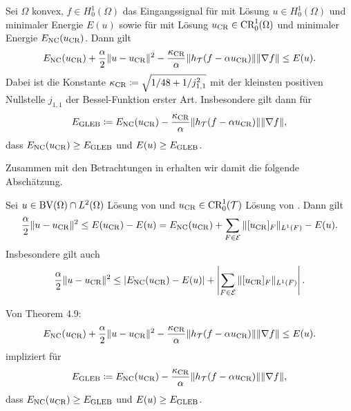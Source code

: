 \begin{theorem}
  \label{thm:gueb}
  Sei $\Omega$ konvex, $f\in H^1_0(\Omega)$ das Eingangssignal für
   mit Lösung $u\in H^1_0(\Omega)$ und minimaler
  Energie $E(u)$ sowie für  mit Lösung $u_\textup{CR}\in
  \textup{CR}^1_0(\Omega)$ und minimaler Energie $E_\textup{NC}(u_\textup{CR})$.
  Dann gilt
  \begin{align*}
    E_\textup{NC}(u_\textup{CR})+\frac{\alpha}{2}\Vert u-u_\textup{CR}\Vert^2
    -\frac{\kappa_{\textup{CR}}}{\alpha}\Vert
    h_{\mathcal{T}}(f-\alpha u_\textup{CR})\Vert \Vert\nabla f\Vert\leq E(u).
  \end{align*}
  Dabei ist die Konstante $\kappa_{\textup{CR}}\coloneqq\sqrt{1/48+1/j_{1,1}^2}$ mit der
  kleinsten positiven Nullstelle $j_{1,1}$ der Bessel-Funktion erster Art.
  Insbesondere gilt dann für 
  \begin{align}
    \label{eq:gleb}
    E_\textup{GLEB} 
    \coloneqq 
    E_\textup{NC}(u_\textup{CR}) - \frac{\kappa_{\textup{CR}}}{\alpha}\Vert h_{\mathcal{T}}(f-\alpha u_\textup{CR})\Vert
    \Vert \nabla f\Vert,
  \end{align}
    dass $E_\textup{NC}(u_\textup{CR})\geq E_\textup{GLEB}$ und $E(u)\geq E_\textup{GLEB}$.

\end{theorem}

Zusammen mit den Betrachtungen in  
erhalten wir damit die folgende Abschätzung.

\begin{corollary}
  Sei $u\in\textup{BV}(\Omega)\cap L^2(\Omega)$ Lösung von
   und $u_\textup{CR}\in\textup{CR}^1_0(\mathcal{T})$ Lösung von
  .
  Dann gilt
  \begin{align*}
    \frac{\alpha}{2}\Vert u-u_\textup{CR}\Vert^2\leq
    E(u_\textup{CR})-E(u)=E_\textup{NC}(u_\textup{CR})+\sum_{F\in\mathcal{E}}\Vert[u_\textup{CR}]_F\Vert_{L^1(F)}-E(u).
  \end{align*}
  Insbesondere gilt auch 
  \begin{align*}
    \frac{\alpha}{2}\Vert u-u_\textup{CR}\Vert^2
    \leq
    \left|E_\textup{NC}(u_\textup{CR})-E(u)\right|+
    \left|\sum_{F\in\mathcal{E}}\Vert[u_\textup{CR}]_F\Vert_{L^1(F)}\right|.
  \end{align*}
\end{corollary}

Von Theorem 4.9:
  \begin{align*}
    E_\textup{NC}(u_\textup{CR})+\frac{\alpha}{2}\Vert u-u_\textup{CR}\Vert^2
    -\frac{\kappa_{\textup{CR}}}{\alpha}\Vert
    h_{\mathcal{T}}(f-\alpha u_\textup{CR})\Vert \Vert\nabla f\Vert\leq E(u).
  \end{align*}
  impliziert für
  \begin{align*}
    E_\textup{GLEB} 
    \coloneqq 
    E_\textup{NC}(u_\textup{CR}) - \frac{\kappa_{\textup{CR}}}{\alpha}\Vert h_{\mathcal{T}}(f-\alpha u_\textup{CR})\Vert
    \Vert \nabla f\Vert,
  \end{align*}
    dass $E_\textup{NC}(u_\textup{CR})\geq E_\textup{GLEB}$ und $E(u)\geq E_\textup{GLEB}$. 

